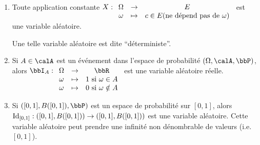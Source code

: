 \begin{exem}
    $\ $
    \begin{enumerate}
        \item Toute application constante $X:
                  \begin{array}[t]{ccc}
                      \Omega & \to & E                                         \\
                      \omega & \mapsto & c \in E (\text{ne dépend pas de } \omega)
                  \end{array}
              $ est une variable aléatoire.

              Une telle variable aléatoire est dite ``déterministe''.
        \item Si $A \in \calA$ est un événement dans l'espace de probabilité $(\Omega, \calA, \bbP)$,
              alors $\bbI_A:
                  \begin{array}[t]{ccc}
                      \Omega & \to & \bbR                          \\
                      \omega & \tp & 1 \text{ si } \omega \in A    \\
                      \omega & \tp & 0 \text{ si } \omega \notin A
                  \end{array}
              $ est une variable aléatoire réelle.
        \item Si $([0, 1], B([0, 1]), \bbP)$ est un espace de probabilité sur $[0, 1]$,
              alors $\operatorname{Id}_{[0, 1]}: ([0, 1], B([0,1])) \to ([0, 1], B([0, 1]))$ est une variable aléatoire.
              Cette variable aléatoire peut prendre une infinité non dénombrable de valeurs (i.e. $[0, 1]$).
    \end{enumerate}
\end{exem}

